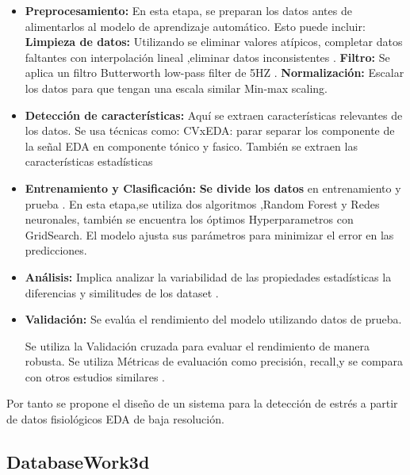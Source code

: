 \begin{itemize}
    \item \textbf{Preprocesamiento:}
En esta etapa, se preparan los datos antes de alimentarlos al modelo de aprendizaje automático. Esto puede incluir:
\textbf{Limpieza de datos:}
Utilizando \cite{DERDIYOK2024109896} se eliminar valores atípicos, completar datos faltantes con  interpolación lineal ,eliminar datos inconsistentes .
\textbf{Filtro:} Se aplica un filtro  Butterworth low-pass filter de 5HZ   .
\textbf{Normalización:} Escalar los datos para que tengan una escala similar Min-max scaling.



    \item \textbf{Detección de características:}
Aquí se extraen características relevantes de los datos.
Se usa  técnicas como:
CVxEDA: parar separar los  componente de la señal EDA en  componente tónico y fasico.
También se  extraen las características estadísticas 


    \item \textbf{Entrenamiento y Clasificación:}
\textbf{Se divide los datos } en entrenamiento y prueba  .
En esta etapa,se utiliza dos algoritmos ,Random Forest y  Redes neuronales, también se encuentra los óptimos Hyperparametros con GridSearch. El modelo ajusta sus parámetros para minimizar el error en las predicciones.

    \item \textbf{Análisis:}
Implica analizar la variabilidad de las propiedades estadísticas la diferencias y similitudes de los dataset .

    \item \textbf{Validación:}
Se evalúa el rendimiento del modelo utilizando datos de prueba.

Se utiliza la Validación cruzada para evaluar el rendimiento de manera robusta.
Se utiliza Métricas de evaluación  como precisión, recall,y se compara con otros estudios similares .



\end{itemize}


Por tanto  se propone  el diseño de  un sistema  para la detección de estrés    a partir de datos fisiológicos EDA de baja resolución.


\subsection*{ DatabaseWork3d}

